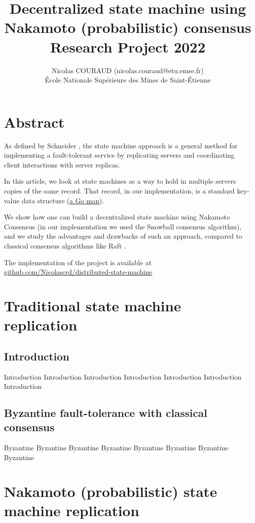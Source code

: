 \documentclass[11pt, twocolumn]{article}
\title{Decentralized state machine using Nakamoto (probabilistic) consensus\\\medskip Research Project 2022}
\author{Nicolas COURAUD (nicolas.couraud@etu.emse.fr)\\École Nationale Supérieure des Mines de Saint-Étienne}
\begin{document}
\maketitle
\onecolumn
\section*{Abstract}

As defined by Schneider \cite{stateMachine}, the state machine approach is a general method for implementing a fault-tolerant service
by replicating servers and coordinating client interactions with server replicas.

In this article, we look at state machines as a way to hold in multiple servers copies of the same record. That record, in our implementation, is a standard 
key-value data structure (\href{https://go.dev/blog/maps}{a Go map}).

We show how one can build a decentralized state machine using Nakamoto Consensus (in our implementation we used the Snowball consensus algorithm), and we study the advantages 
and drawbacks of such an approach, compared to classical consensus algorithms like Raft \cite{understandable}.

The implementation of the project is available at \href{https://github.com/Nicolascrd/distributed-state-machine}{github.com/Nicolascrd/distributed-state-machine}


\tableofcontents
\section{Traditional state machine replication}

\subsection{Introduction}

Introduction
Introduction
Introduction
Introduction
Introduction
Introduction
Introduction

\subsection{Byzantine fault-tolerance with classical consensus}

Byzantine
Byzantine
Byzantine
Byzantine
Byzantine
Byzantine
Byzantine
Byzantine

\section{Nakamoto (probabilistic) state machine replication}
\end{document}
